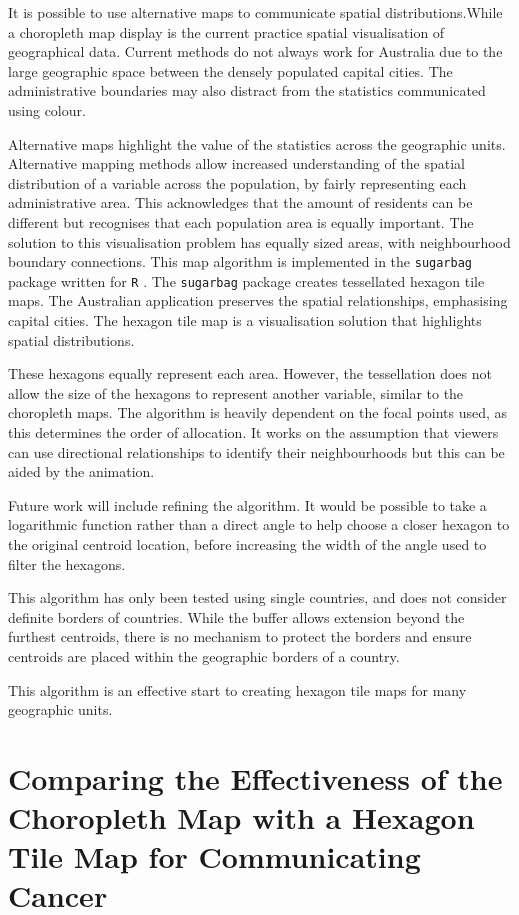 \documentclass{monashthesis}
\begin{document}
It is possible to use alternative maps to communicate spatial distributions.While a choropleth map display is the current practice spatial visualisation of geographical data. Current methods do not always work for Australia due to the large geographic space between the densely populated capital cities. The administrative boundaries may also distract from the statistics communicated using colour.

Alternative maps highlight the value of the statistics across the geographic units. Alternative mapping methods allow increased understanding of the spatial distribution of a variable across the population, by fairly representing each administrative area. This acknowledges that the amount of residents can be different but recognises that each population area is equally important. The solution to this visualisation problem has equally sized areas, with neighbourhood boundary connections. This map algorithm is implemented in the \texttt{sugarbag} \autocite{sugarbag} package written for \texttt{R} \autocite{R}.
The \texttt{sugarbag} package creates tessellated hexagon tile maps. The Australian application preserves the spatial relationships, emphasising capital cities. The hexagon tile map is a visualisation solution that highlights spatial distributions.

These hexagons equally represent each area. However, the tessellation does not allow the size of the hexagons to represent another variable, similar to the choropleth maps.
The algorithm is heavily dependent on the focal points used, as this determines the order of allocation. It works on the assumption that viewers can use directional relationships to identify their neighbourhoods but this can be aided by the animation.

Future work will include refining the algorithm. It would be possible to take a logarithmic function rather than a direct angle to help choose a closer hexagon to the original centroid location, before increasing the width of the angle used to filter the hexagons.

This algorithm has only been tested using single countries, and does not consider definite borders of countries. While the buffer allows extension beyond the furthest centroids, there is no mechanism to protect the borders and ensure centroids are placed within the geographic borders of a country.

This algorithm is an effective start to creating hexagon tile maps for many geographic units.

\hypertarget{experiment}{%
\chapter{Comparing the Effectiveness of the Choropleth Map with a Hexagon Tile Map for Communicating Cancer}\label{experiment}}
\end{document}
